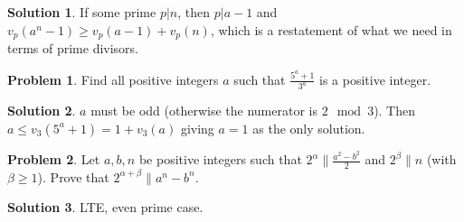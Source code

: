 \documentclass{article}
\theoremstyle{definition}
\newtheorem{problem}{Problem}
\newtheorem*{solution}{Solution}
\begin{document}
\begin{solution}
If some prime $p|n$, then $p|a-1$ and $v_p(a^n-1)\ge v_p(a-1)+v_p(n)$, which is a restatement of what we need in terms of prime divisors.
\end{solution}

\begin{problem}
Find all positive integers $a$ such that $\frac{5^a + 1}{3^a}$ is a positive integer.
\end{problem}

\begin{solution}
$a$ must be odd (otherwise the numerator is $2\mod 3$). Then $a\le v_3(5^a+1)=1+v_3(a)$ giving $a=1$ as the only solution.
\end{solution}

\begin{problem}
Let $ a, b, n $ be positive integers such that $ 2^{\alpha}\|\frac{a^{2}-b^{2}}{2}$ and $ 2^{\beta}\|n$ (with $\beta \geq 1$). Prove that $ 2^{\alpha+\beta}\|a^{n}-b^{n}$.
\end{problem}

\begin{solution}
LTE, even prime case.
\end{solution}
\end{document}
